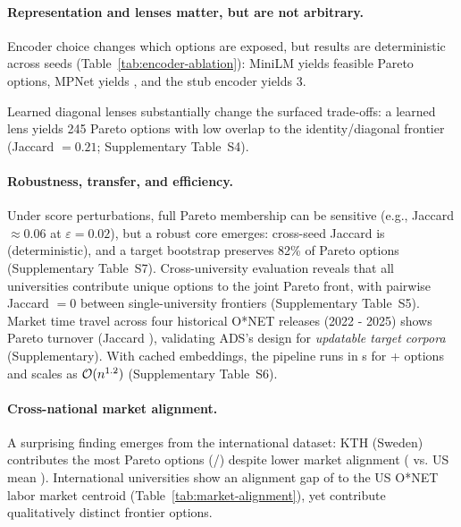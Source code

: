 \documentclass{article}
\newcommand{\ADS}{\textsc{ADS}\xspace}
\begin{document}


\paragraph{Representation and lenses matter, but are not arbitrary.}
Encoder choice changes which options are exposed, but results are deterministic across seeds (Table~\ref{tab:encoder-ablation}): MiniLM yields {\MiniLMParetoSize} feasible Pareto options, MPNet yields {\MPNetParetoSize}, and the stub encoder yields $3$.



Learned diagonal lenses substantially change the surfaced trade-offs: a learned lens yields {245} Pareto options with low overlap to the identity/diagonal frontier (Jaccard $=0.21$; Supplementary Table~S4).

\paragraph{Robustness, transfer, and efficiency.}
Under score perturbations, full Pareto membership can be sensitive (e.g., Jaccard $\approx 0.06$ at $\varepsilon{=}0.02$), but a robust core emerges: cross-seed Jaccard is {\SeedStabilityJaccard} (deterministic), and a target bootstrap preserves 82\% of Pareto options (Supplementary Table~S7). Cross-university evaluation reveals that all {\NumUnisContributing} universities contribute unique options to the joint Pareto front, with pairwise Jaccard $=0$ between single-university frontiers (Supplementary Table~S5). {Market time travel} across four historical O*NET releases (2022 - 2025) shows {\MarketDriftTurnover} Pareto turnover (Jaccard {\MarketDriftJaccard}), validating \ADS's design for \emph{updatable target corpora} (Supplementary). With cached embeddings, the pipeline runs in {\MainRuntimeSec}s for {\HeadlineCourses}+ options and scales as $\mathcal{O}(n^{1.2})$ (Supplementary Table~S6).

\paragraph{Cross-national market alignment.}
A surprising finding emerges from the international dataset: KTH (Sweden) contributes the most Pareto options ({\ParetoKTH}/{\MainParetoSize}) despite lower market alignment ({\AlignKTH} vs. US mean {\AlignUSMean}). International universities show an alignment gap of {\AlignGap} to the US O*NET labor market centroid (Table~\ref{tab:market-alignment}), yet contribute qualitatively distinct frontier options.
\end{document}
